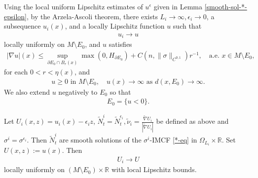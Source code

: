 \documentclass[11pt, letterpaper]{amsart}
\theoremstyle{definition}
\theoremstyle{remark}
\begin{document}
Using the local uniform Lipschitz estimates of $u^{\epsilon }$ given in Lemma \ref{smooth-sol-*-epsilon}, by the Arzela-Ascoli theorem, there exists $L_i \to \infty, \epsilon _i \to 0$, a subsequence $u_i(x)$, and a locally Lipschitz function $u$ such that
\begin{align*}
	u_i \to u
\end{align*} 
locally uniformly on $M \setminus E_0$, and $u$ satisfies 
\begin{align}\label{u-Lip-bound}
	|\nabla u|(x) \leq \sup_{\partial E_0 \cap B_r(x)} \max(0, H_{\partial E_0}) + C(n, \|\sigma \|_{C^{0,1}}) r ^{-1},\quad \text{a.e. } x \in M\setminus E_0,
\end{align}
for each $0< r< \eta (x)$, and
\begin{align}\label{u-boundary-outer}
	u \geq 0 \text{ in } M \setminus E_0,\quad u(x) \to \infty \text{ as } d(x, E_0) \to \infty.
\end{align} 
We also extend $u$ negatively to $E_0$ so that
\begin{align}\label{u-boundary-inner}
	E_0 = \{ u< 0\} .
\end{align}

Let $U_i(x,z) = u_i(x) - \epsilon _i z$, $\tilde{N}^{i}_t = \tilde{N}^{\epsilon _i}_t, \tilde{\nu }_i = \frac{\tilde{\nabla }U_i}{|\tilde{\nabla }U_i|}$ be defined as above and $\sigma ^{i}= \sigma ^{\epsilon _i}$. Then $\tilde{N}^{i}_t$ are smooth solutions of the $\sigma ^{i}$-IMCF \ref{*-eq} in $\Omega _{L_i} \times \mathbb{R}$.
  Set $U(x, z) := u(x)$. Then
  \begin{align}\label{U_i-U}
	U_i \to U
\end{align} 
locally uniformly on $(M\setminus E_0) \times \mathbb{R}$ with local Lipschitz bounds. 
\end{document}
